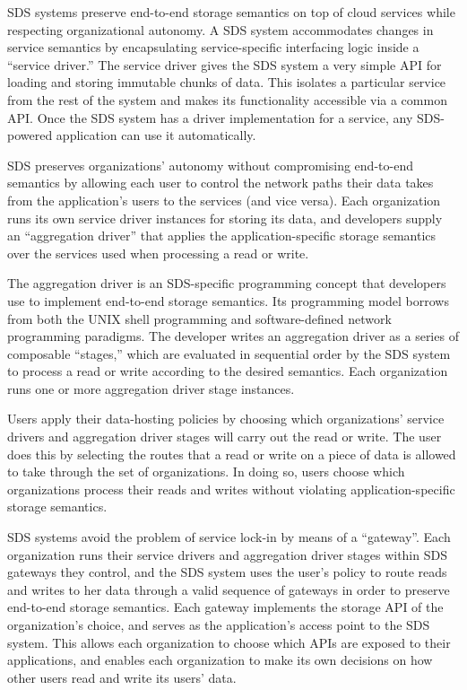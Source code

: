 SDS systems preserve end-to-end storage semantics on top of cloud services while respecting
organizational autonomy.  A SDS system accommodates changes in service semantics
by encapsulating service-specific interfacing logic inside a ``service driver.''
The service driver gives the SDS system a very simple API for loading and
storing immutable chunks of data.  This isolates a particular service from the rest of the
system and makes its functionality accessible via a common API.  Once the SDS system has a
driver implementation for a service, any SDS-powered application can use it
automatically.

SDS preserves organizations' autonomy without compromising end-to-end semantics by
allowing each user to control the network paths their data takes from the
application's users to the services (and vice versa).  Each organization runs its own
service driver instances for storing its data, and developers supply an
``aggregation driver'' that applies the application-specific storage semantics
over the services used when processing a read or write.

The aggregation driver is an SDS-specific programming concept that developers
use to implement end-to-end storage semantics.  Its
programming model borrows from both the UNIX shell programming and software-defined
network programming paradigms.  The developer writes an aggregation driver as a
series of composable ``stages,'' which are evaluated in sequential order by the
SDS system to process a read or write according to the desired semantics.
Each organization runs one or more aggregation driver stage instances.

Users apply their data-hosting policies by choosing which organizations' service
drivers and aggregation driver stages will carry out the read or write.  The
user does this by selecting the routes that a read or write on a piece of data
is allowed to take through the set of organizations.  In doing so, users choose
which organizations process their reads and writes without violating
application-specific storage semantics.

SDS systems avoid the problem of service lock-in by means of a ``gateway''.
Each organization runs their service drivers and aggregation driver stages
within SDS gateways they control, and the SDS system uses the user's policy
to route reads and writes to her data through a valid sequence of gateways 
in order to preserve end-to-end storage semantics.
Each gateway implements the storage API of the
organization's choice, and serves as the application's access point to the SDS
system.  This allows each organization to choose which APIs are exposed to their
applications, and enables each organization to make its own decisions on how
other users read and write its users' data.

